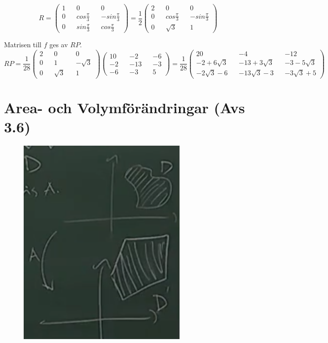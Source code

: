 \begin{equation*}
    R=\begin{pmatrix}
        1&&0&&0\\
        0&&cos\frac{\pi}{3}&&-sin\frac{\pi}{3}\\
        0&&sin\frac{\pi}{3}&&cos\frac{\pi}{3}
    \end{pmatrix}=
    \frac{1}{2}\begin{pmatrix}
        2&&0&&0\\
        0&&cos\frac{\pi}{3}&&-sin\frac{\pi}{3}\\
        0&&\sqrt{3}&&1
    \end{pmatrix}
\end{equation*}

Matrisen till $f$ ges av $RP$.\\
\begin{equation*}
    RP=\frac{1}{28}\begin{pmatrix}
        2&&0&&0\\
        0&&1&&-\sqrt{3}\\
        0&&\sqrt{3}&&1
    \end{pmatrix}\begin{pmatrix}
        10&&-2&&-6\\
        -2&&-13&&-3\\
        -6&&-3&&5
    \end{pmatrix}=
    \frac{1}{28}\begin{pmatrix}
        20&&-4&&-12\\
        -2+6\sqrt{3}&&-13+3\sqrt{3}&&-3-5\sqrt{3}\\
        -2\sqrt{3}-6&&-13\sqrt{3}-3&&-3\sqrt{3}+5
    \end{pmatrix}
\end{equation*}

\chapter{Area- och Volymförändringar (Avs 3.6)}
\begin{figure}
    \vspace{-50pt}
    \centering
    \includegraphics[scale=0.4]{imgs/img03.png}
    \vspace{-30pt}
\end{figure}
